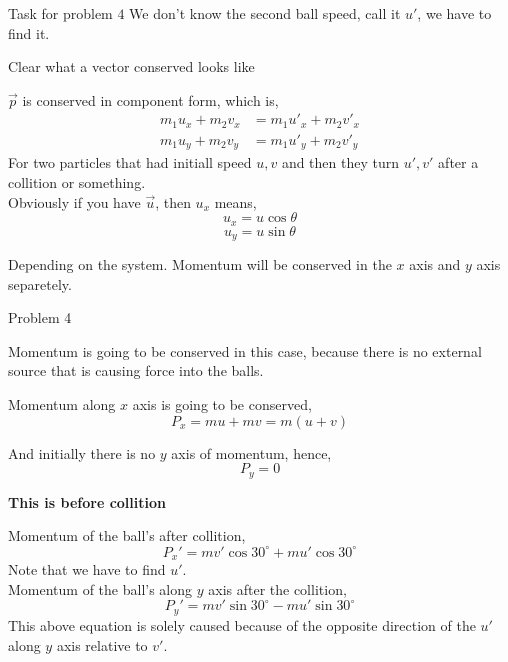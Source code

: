 \documentclass[9pt]{memoir}
\newcommand{\draw}[3]{ \begin{figure}[hbt!] \centering
 \fontsize{35pt}{20pt}\selectfont \resizebox{#1 \textwidth}{!}{
{#2.pdf_tex}}\caption{#3} \label{#3} \end{figure} }
\begin{document}
\begin{frame}
    {Task for problem $4$}
    We don't know the second ball speed, call it $u'$, we have to find it.
\end{frame}

\begin{frame}
    {Clear what a vector conserved looks like}
{    $\vec p$ is conserved in component form, which is, 
    \begin{align*}
        m_1 u_x + m_2 v_x &= m_1 u'_x + m_2 v'_x \\
        m_1 u_y + m_2 v_y &= m_1 u'_y + m_2 v'_y 
    \end{align*}
    For two particles that had initiall speed $u, v$ and then they turn $u', v'$ after a collition or something.  \\ 
    Obviously if you have $\vec u$, then $u_x$ means, 
    \[ u_x = u \cos \theta \]
    \[ u_y = u \sin \theta \]
    
    Depending on the system.
   Momentum will be conserved in the $x$ axis and $y$ axis separetely.  
    }{ 
   } 
    

\end{frame}



\begin{frame}
    {Problem 4}
    {
        Momentum is going to be conserved in this case, because there is no external source that is causing force into the balls. 

        Momentum along $x$ axis is going to be conserved, 
        \[ P_x = mu + mv = m\left( u + v \right)  \] 

        And initially there is no $y$ axis of momentum, hence, 
         \[ P_y = 0 \]
         
         \textbf{This is before collition}
        }{
    \draw{0.95}{prob4_1}{}}
\end{frame}



\begin{frame}
    { 
        Momentum of the ball's after collition, 
        \[ P_x' = mv' \cos 30^{\circ} + mu' \cos 30^{\circ} \]
        Note that we have to find $u'$. \\

        Momentum of the ball's along $y$ axis after the collition, 
        \[ P_y' = mv' \sin 30^{\circ} - mu'\sin 30^{\circ} \] This above equation is solely caused because of the opposite direction of the $u'$ along $y$ axis relative to $v'$.
    }{ \draw{0.95}{prob4_1}{}}
\end{frame}
\end{document}

